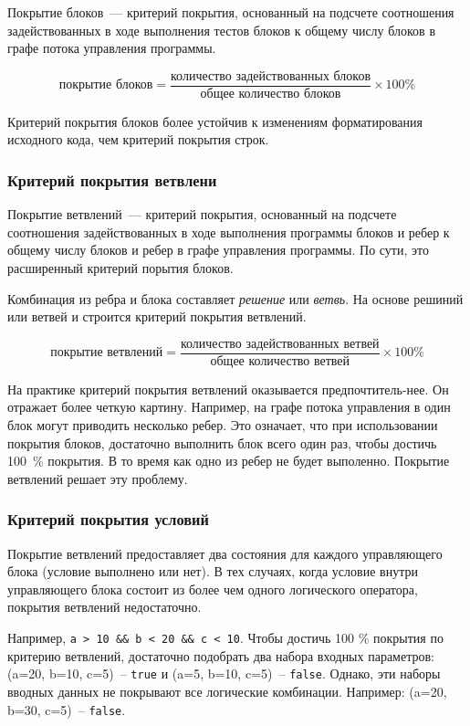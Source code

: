 Покрытие блоков~--- критерий покрытия, основанный на подсчете соотношения задействованных в ходе выполнения тестов блоков к общему числу блоков в графе потока управления программы.

\[ \text{покрытие блоков} = \frac{\text{количество задействованных блоков}}{\text{общее количество блоков}}  \times 100 \% \]

Критерий покрытия блоков более устойчив к изменениям форматирования исходного кода, чем критерий покрытия строк.


\subsubsection{Критерий покрытия ветвлени}

Покрытие ветвлений~--- критерий покрытия, основанный на подсчете соотношения задействованных в ходе выполнения программы блоков и ребер к общему числу блоков и ребер в графе управления программы. По сути, это расширенный критерий порытия блоков. 


Комбинация из ребра и блока составляет \textit{решение} или \textit{ветвь}. На основе решиний или ветвей и строится критерий покрытия ветвлений.

\[ \text{покрытие ветвлений} = \frac{\text{количество задействованных ветвей}}{\text{общее количество ветвей}}  \times 100 \% \]


На практике критерий покрытия ветвлений оказывается предпочтитель-нее. Он отражает более четкую картину. Например, на графе потока управления в один блок могут приводить несколько ребер. Это означает, что при использовании покрытия блоков, достаточно выполнить блок всего один раз, чтобы достичь 100~\% покрытия. В то время как одно из ребер не будет выполенно. Покрытие ветвлений решает эту проблему.

\subsubsection{Критерий покрытия условий}

Покрытие ветвлений предоставляет два состояния для каждого управляющего блока (условие выполнено или нет). В тех случаях, когда условие внутри управляющего блока состоит из более чем одного логического оператора, покрытия ветвлений недостаточно. 

Например, \texttt{a > 10 \&\& b < 20 \&\& c < 10}. Чтобы достичь 100 \% покрытия по критерию ветвлений, достаточно подобрать два набора входных параметров: (a=20, b=10, c=5)~-- \texttt{true} и (a=5, b=10, c=5)~-- \texttt{false}. Однако, эти наборы вводных данных не покрывают все логические комбинации. Например: (a=20, b=30, c=5)~-- \texttt{false}.

